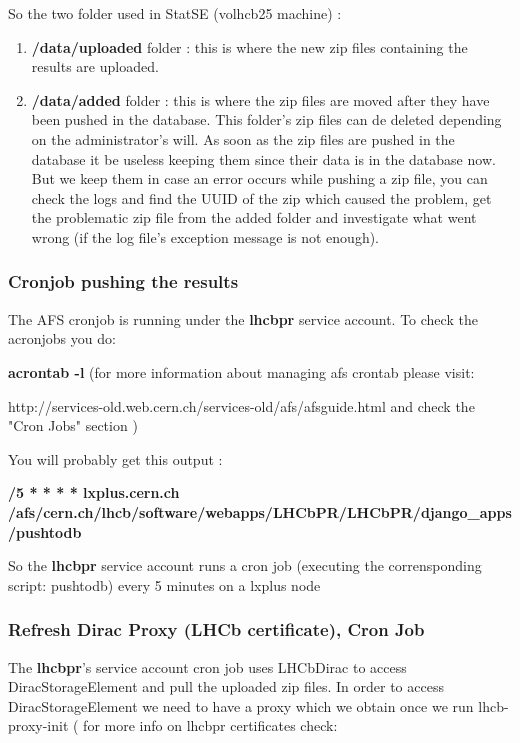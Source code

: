 \documentclass{lhcbnote}
\begin{document}
So the two folder used in StatSE (volhcb25 machine) :

\begin {enumerate}
\item
{\bf /data/uploaded} folder   : this is where the new zip files containing the results are uploaded.
\item
{\bf /data/added} folder : this is where the zip files are moved after they have been pushed in the database. This folder's zip files can de deleted depending on the administrator's will. 
As soon as the zip files are pushed in the database it be useless keeping them since their data is in the database now. But we keep them in case an error occurs while pushing a zip file, 
you can check the logs and find the UUID of the zip which caused the problem, 
get the problematic zip file from the added folder and investigate what went wrong (if the log file's exception message is not enough).
\end {enumerate}

\subsubsection {Cronjob pushing the results}

The AFS cronjob is running under the {\bf lhcbpr} service account. To check the acronjobs you do:

\vspace {2mm}
{\bf acrontab -l} (for more information about managing afs crontab please visit: 

http://services-old.web.cern.ch/services-old/afs/afsguide.html and check the "Cron Jobs" section )

\vspace {2mm}
You will probably get this output : 

{\bf */5 * * * * lxplus.cern.ch /afs/cern.ch/lhcb/software/webapps/LHCbPR/LHCbPR/django\_apps/pushtodb}

\vspace {2mm}

So the {\bf lhcbpr} service account runs a cron job (executing the corrensponding script: pushtodb) every 5 minutes on a lxplus node


\subsubsection {Refresh Dirac Proxy (LHCb certificate), Cron Job}

The {\bf lhcbpr}'s service account cron job uses LHCbDirac to access DiracStorageElement and pull the uploaded zip files. In order to access DiracStorageElement 
we need to have a proxy which we obtain once we run lhcb-proxy-init ( for more info on lhcbpr certificates check: 
\end{document}
